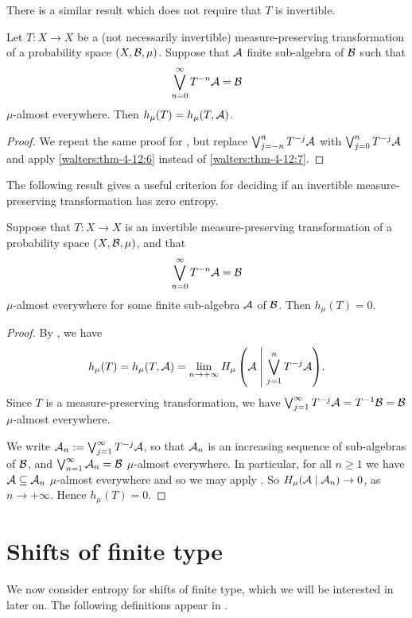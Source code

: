 There is a similar result which does not require that $T$ is invertible.

\begin{theorem} \label{thm:walters-4-18}
	Let $T : X \to X$ be a (not necessarily invertible) measure-preserving transformation of a probability space $(X, \mathcal{B}, \mu)$. Suppose that $\mathcal{A}$ finite sub-algebra of $\mathcal{B}$ such that
	\[
		\bigvee_{n = 0}^\infty{T^{-n}{\mathcal{A}}} = \mathcal{B}
	\]
	$\mu$-almost everywhere. Then $h_\mu(T) = h_\mu(T, \mathcal{A})$.
	
	\begin{proof}
		We repeat the same proof for , but replace $\bigvee_{j = -n}^n{T^{-j}{\mathcal{A}}}$ with $\bigvee_{j = 0}^n{T^{-j}{\mathcal{A}}}$ and apply  \ref{walters:thm-4-12:6} instead of \ref{walters:thm-4-12:7}.
	\end{proof}
\end{theorem}

The following result gives a useful criterion for deciding if an invertible measure-preserving transformation has zero entropy.

\begin{corollary}
	Suppose that $T : X \to X$ is an invertible measure-preserving transformation of a probability space $(X, \mathcal{B}, \mu)$, and that
	\[
		\bigvee_{n = 0}^\infty{T^{-n}{\mathcal{A}}} = \mathcal{B}
	\]
	$\mu$-almost everywhere for some finite sub-algebra $\mathcal{A}$ of $\mathcal{B}$. Then $h_\mu(T) = 0$.
	
	\begin{proof}
		By , we have
		\[
			h_\mu(T) = h_\mu(T, \mathcal{A}) = \lim_{n \to +\infty}{H_\mu\left(\mathcal{A} \mathrel{}\middle|\mathrel{} \bigvee_{j = 1}^n{T^{-j}{\mathcal{A}}}\right)}.
		\]
		Since $T$ is a measure-preserving transformation, we have $\bigvee_{j = 1}^\infty{T^{-j}{\mathcal{A}}} = T^{-1}{\mathcal{B}} = \mathcal{B}$ $\mu$-almost everywhere.
		
		We write $\mathcal{A}_n := \bigvee_{j = 1}^\infty{T^{-j}{\mathcal{A}}}$, so that $\mathcal{A}_n$ is an increasing sequence of sub-algebras of $\mathcal{B}$, and $\bigvee_{n = 1}^\infty{\mathcal{A}_n} = \mathcal{B}$ $\mu$-almost everywhere. In particular, for all $n \geq 1$ we have $\mathcal{A} \subseteq \mathcal{A}_n$ $\mu$-almost everywhere and so we may apply . So $H_\mu(\mathcal{A} \mid \mathcal{A}_n) \to 0$, as $n \to +\infty$. Hence $h_\mu(T) = 0$.
	\end{proof}
\end{corollary}

\section{Shifts of finite type} \label{sec:entropy:sft}
We now consider entropy for shifts of finite type, which we will be interested in later on. The following definitions appear in \cite{chazottes-maldonado:cbfee}.

